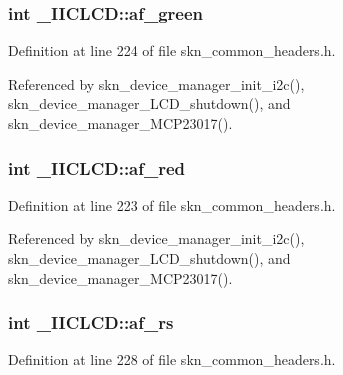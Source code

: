 \subsubsection[{\texorpdfstring{af\+\_\+green}{af_green}}]{\setlength{\rightskip}{0pt plus 5cm}int \+\_\+\+I\+I\+C\+L\+C\+D\+::af\+\_\+green}\hypertarget{struct___i_i_c_l_c_d_a70176d63c9065d4186f55ae8328a82d3}{}\label{struct___i_i_c_l_c_d_a70176d63c9065d4186f55ae8328a82d3}


Definition at line 224 of file skn\+\_\+common\+\_\+headers.\+h.



Referenced by skn\+\_\+device\+\_\+manager\+\_\+init\+\_\+i2c(), skn\+\_\+device\+\_\+manager\+\_\+\+L\+C\+D\+\_\+shutdown(), and skn\+\_\+device\+\_\+manager\+\_\+\+M\+C\+P23017().

\subsubsection[{\texorpdfstring{af\+\_\+red}{af_red}}]{\setlength{\rightskip}{0pt plus 5cm}int \+\_\+\+I\+I\+C\+L\+C\+D\+::af\+\_\+red}\hypertarget{struct___i_i_c_l_c_d_aca8ab39cfa9f683b2d03269886a0f633}{}\label{struct___i_i_c_l_c_d_aca8ab39cfa9f683b2d03269886a0f633}


Definition at line 223 of file skn\+\_\+common\+\_\+headers.\+h.



Referenced by skn\+\_\+device\+\_\+manager\+\_\+init\+\_\+i2c(), skn\+\_\+device\+\_\+manager\+\_\+\+L\+C\+D\+\_\+shutdown(), and skn\+\_\+device\+\_\+manager\+\_\+\+M\+C\+P23017().

\subsubsection[{\texorpdfstring{af\+\_\+rs}{af_rs}}]{\setlength{\rightskip}{0pt plus 5cm}int \+\_\+\+I\+I\+C\+L\+C\+D\+::af\+\_\+rs}\hypertarget{struct___i_i_c_l_c_d_af738bf1e020daaa5476b917c375e807a}{}\label{struct___i_i_c_l_c_d_af738bf1e020daaa5476b917c375e807a}


Definition at line 228 of file skn\+\_\+common\+\_\+headers.\+h.




